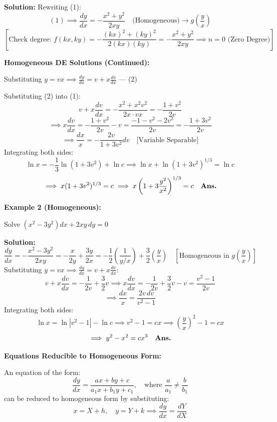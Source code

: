 \documentclass[11pt,a4paper]{article}
\newcommand{\Heading}[1]{\vspace{0.3cm}\noindent\textbf{\textcolor{AcademicGreen}{\large #1}}\par\vspace{0.15cm}}
\begin{document}
\vspace{0.15cm}
\noindent\textbf{Solution:} Rewriting (1):
\[
(1) \implies \frac{dy}{dx} = -\frac{x^2 + y^2}{2xy} \quad \text{(Homogeneous)} \longrightarrow g\left(\frac{y}{x}\right)
\]
\[
\left[\text{Check degree: } f(kx, ky) = -\frac{(kx)^2 + (ky)^2}{2(kx)(ky)} = -\frac{x^2 + y^2}{2xy} \implies n=0 \text{ (Zero Degree)}\right]
\]

\newpage

\Heading{Homogeneous DE Solutions (Continued):}
Substituting $y = vx \implies \frac{dy}{dx} = v + x\frac{dv}{dx}$ \quad --- (2)

\noindent Substituting (2) into (1):
\[
v + x\frac{dv}{dx} = -\frac{x^2 + x^2 v^2}{2x \cdot vx} = -\frac{1 + v^2}{2v}
\]
\[
\implies x\frac{dv}{dx} = -\frac{1 + v^2}{2v} - v = \frac{-1 - v^2 - 2v^2}{2v} = -\frac{1 + 3v^2}{2v}
\]
\[
\implies \frac{dx}{x} = -\frac{2v}{1 + 3v^2} dv \quad \text{[Variable Separable]}
\]
Integrating both sides:
\[
\ln x = -\frac{1}{3}\ln(1 + 3v^2) + \ln c \implies \ln x + \ln(1 + 3v^2)^{1/3} = \ln c
\]
\[
\implies x(1 + 3v^2)^{1/3} = c \implies x\left(1 + 3\frac{y^2}{x^2}\right)^{1/3} = c \quad \text{\textbf{Ans.}}
\]

\vspace{0.4cm}
\Heading{Example 2 (Homogeneous):}
Solve $(x^2 - 3y^2)dx + 2xy \, dy = 0$

\vspace{0.15cm}
\noindent\textbf{Solution:}
\[
\frac{dy}{dx} = -\frac{x^2 - 3y^2}{2xy} = -\frac{x}{2y} + \frac{3y}{2x} = -\frac{1}{2}\left(\frac{1}{y/x}\right) + \frac{3}{2}\left(\frac{y}{x}\right) \quad \left[\text{Homogeneous in } g\left(\frac{y}{x}\right)\right]
\]
Substituting $y = vx \implies \frac{dy}{dx} = v + x\frac{dv}{dx}$:
\[
v + x\frac{dv}{dx} = -\frac{1}{2v} + \frac{3}{2}v \implies x\frac{dv}{dx} = -\frac{1}{2v} + \frac{3}{2}v - v = \frac{v^2 - 1}{2v}
\]
\[
\implies \frac{dx}{x} = \frac{2v \, dv}{v^2 - 1}
\]
Integrating both sides:
\[
\ln x = \ln|v^2 - 1| - \ln c \implies v^2 - 1 = cx \implies \left(\frac{y}{x}\right)^2 - 1 = cx
\]
\[
\implies y^2 - x^2 = cx^3 \quad \text{\textbf{Ans.}}
\]

\newpage

\Heading{Equations Reducible to Homogeneous Form:}
An equation of the form:
\[
\frac{dy}{dx} = \frac{ax + by + c}{a_1 x + b_1 y + c_1}, \quad \text{where } \frac{a}{a_1} \neq \frac{b}{b_1}
\]
can be reduced to homogeneous form by substituting:
\[
x = X + h, \quad y = Y + k \implies \frac{dy}{dx} = \frac{dY}{dX}
\]
\end{document}
